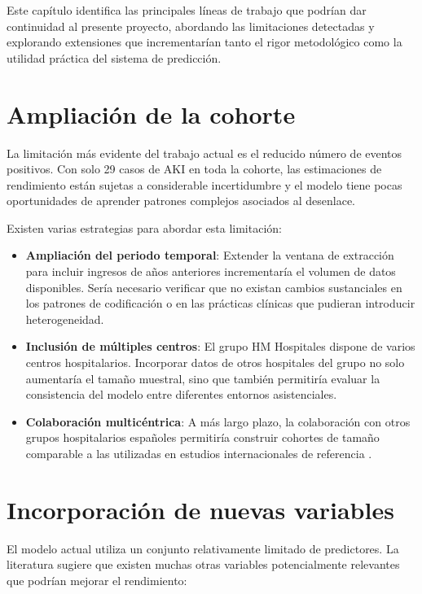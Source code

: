\documentclass[12pt, a4paper, oneside]{report}
\begin{document}
Este capítulo identifica las principales líneas de trabajo que podrían dar continuidad al presente proyecto, abordando las limitaciones detectadas y explorando extensiones que incrementarían tanto el rigor metodológico como la utilidad práctica del sistema de predicción.

\section{Ampliación de la cohorte}

La limitación más evidente del trabajo actual es el reducido número de eventos positivos. Con solo 29 casos de AKI en toda la cohorte, las estimaciones de rendimiento están sujetas a considerable incertidumbre y el modelo tiene pocas oportunidades de aprender patrones complejos asociados al desenlace.

Existen varias estrategias para abordar esta limitación:

\begin{itemize}
    \item \textbf{Ampliación del periodo temporal}: Extender la ventana de extracción para incluir ingresos de años anteriores incrementaría el volumen de datos disponibles. Sería necesario verificar que no existan cambios sustanciales en los patrones de codificación o en las prácticas clínicas que pudieran introducir heterogeneidad.
    
    \item \textbf{Inclusión de múltiples centros}: El grupo HM Hospitales dispone de varios centros hospitalarios. Incorporar datos de otros hospitales del grupo no solo aumentaría el tamaño muestral, sino que también permitiría evaluar la consistencia del modelo entre diferentes entornos asistenciales.
    
    \item \textbf{Colaboración multicéntrica}: A más largo plazo, la colaboración con otros grupos hospitalarios españoles permitiría construir cohortes de tamaño comparable a las utilizadas en estudios internacionales de referencia \cite{tomasev2019nature, churpek2020jama}.
\end{itemize}

\section{Incorporación de nuevas variables}

El modelo actual utiliza un conjunto relativamente limitado de predictores. La literatura sugiere que existen muchas otras variables potencialmente relevantes que podrían mejorar el rendimiento:
\end{document}
